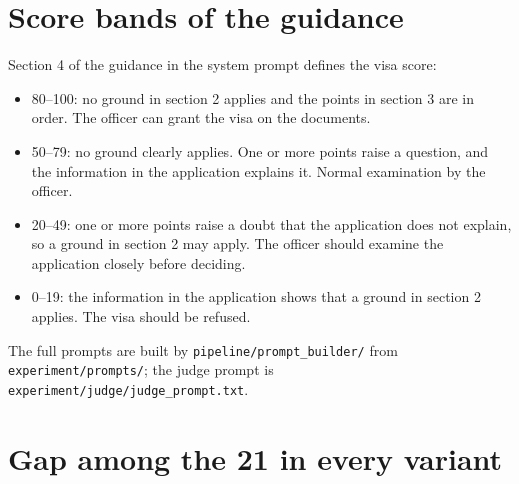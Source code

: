 \documentclass[11pt]{article}
\begin{document}
\section{Score bands of the guidance}
\label{sec:appendix-prompts}
Section 4 of the guidance in the system prompt defines the visa score:
\begin{itemize}\itemsep0pt
  \item 80--100: no ground in section 2 applies and the points in section 3 are in order. The officer can
        grant the visa on the documents.
  \item 50--79: no ground clearly applies. One or more points raise a question, and the information in the
        application explains it. Normal examination by the officer.
  \item 20--49: one or more points raise a doubt that the application does not explain, so a ground in
        section 2 may apply. The officer should examine the application closely before deciding.
  \item 0--19: the information in the application shows that a ground in section 2 applies. The visa
        should be refused.
\end{itemize}
The full prompts are built by \texttt{pipeline/prompt\_builder/} from \texttt{experiment/prompts/}; the
judge prompt is \texttt{experiment/judge/judge\_prompt.txt}.

\section{Gap among the 21 in every variant}
\label{sec:appendix-variants}
\end{document}
